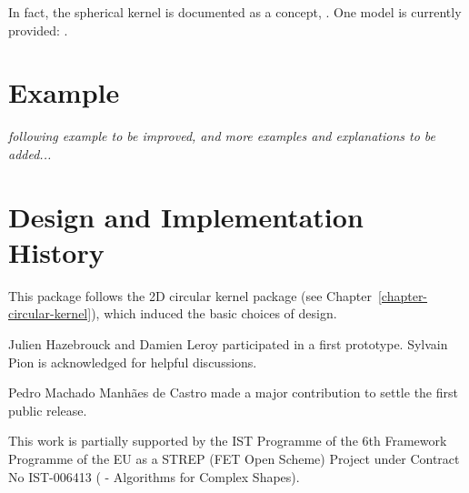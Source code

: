 In fact, the spherical kernel is documented as a concept,
. One model is currently provided: 
.

\section{Example}
\textit{following example to be improved, and more examples and explanations to be added...}


\section{Design and Implementation History}

This package follows the 2D circular kernel package (see
Chapter~\ref{chapter-circular-kernel}), which induced the basic
choices of design.

Julien Hazebrouck and Damien Leroy participated in a first
prototype. Sylvain Pion is acknowledged for helpful discussions.

Pedro Machado Manh\~{a}es de Castro made a major contribution to
settle the first public release.

This work is partially supported by the IST Programme of the 6th
Framework Programme of the EU as a STREP (FET Open Scheme) Project
under Contract No IST-006413 ( -
Algorithms for Complex Shapes).
